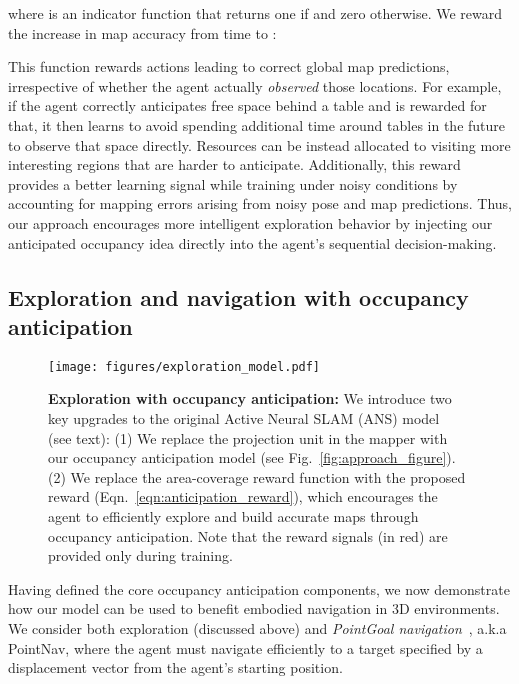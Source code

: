\documentclass[runningheads]{llncs}
\newcommand{\tb}[1]{\textbf{#1}}
\begin{document}
where  is an indicator function that returns one if  and zero otherwise. We reward the increase in map accuracy from time  to :


This function rewards actions leading to correct global map predictions, irrespective of whether the agent actually \emph{observed} those locations. For example, if the agent correctly anticipates free space behind a table and is rewarded for that, it then learns to avoid spending additional time around tables in the future to observe that space directly. Resources can be instead allocated to visiting more interesting regions that are harder to anticipate. Additionally, this reward provides a better learning signal while training under noisy conditions by accounting for mapping errors arising from noisy pose and map predictions. Thus, our approach encourages more intelligent exploration behavior by injecting our anticipated occupancy idea directly into the agent's sequential decision-making.


\subsection{Exploration and navigation with occupancy anticipation}
\label{sec:navigation_model}

\begin{figure}[t]
    \centering
    \texttt{[image: figures/exploration\_model.pdf]}
    \caption{\small\tb{Exploration with occupancy anticipation:} We introduce two key upgrades to the original Active Neural SLAM (ANS) model~\cite{chaplot2020learning} (see text): (1) We replace the projection unit in the mapper with our occupancy anticipation model (see Fig.~\ref{fig:approach_figure}). (2) We replace the area-coverage reward function with the proposed reward (Eqn.~\ref{eqn:anticipation_reward}), which encourages the agent to efficiently explore and build accurate maps through occupancy anticipation. Note that the reward signals (in red) are provided only during training.}
    \label{fig:exploration_model}
\end{figure}

Having defined the core occupancy anticipation components, we now demonstrate how our model can be used to benefit embodied navigation in 3D environments. We consider both exploration (discussed above) and \emph{PointGoal navigation}~\cite{savva2017minos,anderson2018evaluation}, a.k.a PointNav, where the agent must navigate efficiently to a target specified by a displacement vector from the agent's starting position.
\end{document}

